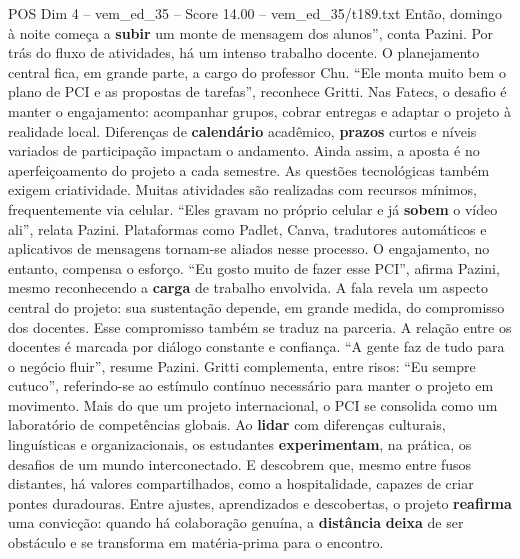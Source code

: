 \begin{textsample}{POS Dim 4 – vem\_ed\_35 – Score 14.00 – vem\_ed\_35/t189.txt}
Então, domingo à noite começa a \textbf{subir} um monte de mensagem dos alunos”, conta Pazini.
Por trás do fluxo de atividades, há um intenso trabalho docente.
O planejamento central fica, em grande parte, a cargo do professor Chu. “Ele monta muito bem o plano de PCI e as propostas de tarefas”, reconhece Gritti.
Nas Fatecs, o desafio é manter o engajamento: acompanhar grupos, cobrar entregas e adaptar o projeto à realidade local.
Diferenças de \textbf{calendário} acadêmico, \textbf{prazos} curtos e níveis variados de participação impactam o andamento.
Ainda assim, a aposta é no aperfeiçoamento do projeto a cada semestre.
As questões tecnológicas também exigem criatividade.
Muitas atividades são realizadas com recursos mínimos, frequentemente via celular. “Eles gravam no próprio celular e já \textbf{sobem} o vídeo ali”, relata Pazini.
Plataformas como Padlet, Canva, tradutores automáticos e aplicativos de mensagens tornam-se aliados nesse processo.
O engajamento, no entanto, compensa o esforço. “Eu gosto muito de fazer esse PCI”, afirma Pazini, mesmo reconhecendo a \textbf{carga} de trabalho envolvida.
A fala revela um aspecto central do projeto: sua sustentação depende, em grande medida, do compromisso dos docentes.
Esse compromisso também se traduz na parceria.
A relação entre os docentes é marcada por diálogo constante e confiança. “A gente faz de tudo para o negócio fluir”, resume Pazini.
Gritti complementa, entre risos: “Eu sempre cutuco”, referindo-se ao estímulo contínuo necessário para manter o projeto em movimento.
Mais do que um projeto internacional, o PCI se consolida como um laboratório de competências globais.
Ao \textbf{lidar} com diferenças culturais, linguísticas e organizacionais, os estudantes \textbf{experimentam}, na prática, os desafios de um mundo interconectado.
E descobrem que, mesmo entre fusos distantes, há valores compartilhados, como a hospitalidade, capazes de criar pontes duradouras.
Entre ajustes, aprendizados e descobertas, o projeto \textbf{reafirma} uma convicção: quando há colaboração genuína, a \textbf{distância} \textbf{deixa} de ser obstáculo e se transforma em matéria-prima para o encontro.

\end{textsample}
